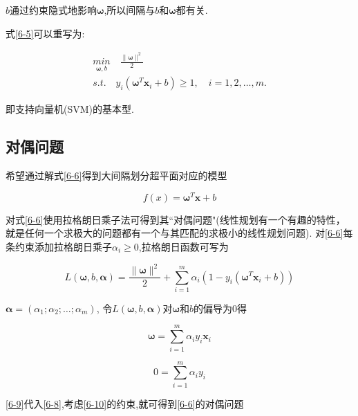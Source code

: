 \documentclass[12pt]{article}
\numberwithin{equation}{section}%
\begin{document}
$b$通过约束隐式地影响$\boldsymbol{\omega}$,所以间隔与$b$和$\boldsymbol{\omega}$都有关.

式\ref{6-5}可以重写为:

\begin{equation}
\begin{split}        %
 {\underset{\boldsymbol{\omega},b}{min}} \quad \frac{\parallel \boldsymbol{\omega} \parallel^{2}}{2} \\
 s.t. \quad y_{i}(\boldsymbol{\omega}^{T}\boldsymbol{x}_{i}+b) \geqslant 1, \quad i= 1,2, \ldots ,m.
\end{split}
\label{6-6}
\end{equation}

即支持向量机(SVM)的基本型.

\subsection{对偶问题}

希望通过解式\ref{6-6}得到大间隔划分超平面对应的模型

\begin{equation}
f(x)=\boldsymbol{\omega}^{T}\boldsymbol{x}+b
\label{6-7}
\end{equation}

对式\ref{6-6}使用拉格朗日乘子法可得到其``对偶问题"(线性规划有一个有趣的特性，就是任何一个求极大的问题都有一个与其匹配的求极小的线性规划问题). 对\ref{6-6}每条约束添加拉格朗日乘子$\alpha_{i} \geqslant 0$,拉格朗日函数可写为

\begin{equation}
L(\boldsymbol{\omega},b,\boldsymbol{\alpha})=\frac{\parallel \boldsymbol{\omega} \parallel^{2}}{2}+\sum_{i=1}^{m}\alpha_{i}(1-y_{i}(\boldsymbol{\omega}^{T}\boldsymbol{x}_{i}+b))
\label{6-8}
\end{equation}

$\boldsymbol{\alpha}=(\alpha_{1};\alpha_{2};\ldots;\alpha_{m})$, 令$L(\boldsymbol{\omega},b,\boldsymbol{\alpha})$对$\boldsymbol{\omega}$和$b$的偏导为0得

\begin{equation}
\boldsymbol{\omega}=\sum_{i=1}^{m}\alpha_{i}y_{i}\boldsymbol{x}_{i}
\label{6-9}
\end{equation}

\begin{equation}
0=\sum_{i=1}^{m}\alpha_{i}y_{i}
\label{6-10}
\end{equation}

\ref{6-9}代入\ref{6-8},考虑\ref{6-10}的约束,就可得到\ref{6-6}的对偶问题
\end{document}

